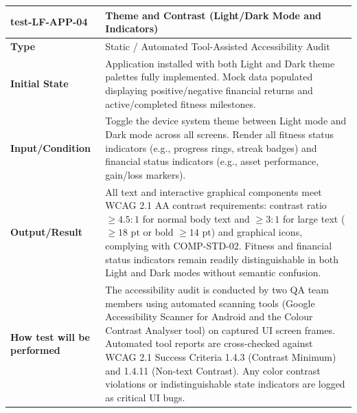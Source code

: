 \documentclass[12pt, titlepage]{article}
\begin{document}
\noindent\begin{tabularx}{\textwidth}{>{\raggedright\arraybackslash}p{3.5cm}X}
  \toprule
  \textbf{test-LF-APP-04}\label{test:LF-APP-04} & \textbf{Theme and Contrast (Light/Dark Mode and Indicators)}\\
  \midrule
  \textbf{Type} & Static / Automated Tool-Assisted Accessibility Audit\\
  \textbf{Initial State} & Application installed with both Light and Dark theme palettes fully implemented. Mock data populated displaying positive/negative financial returns and active/completed fitness milestones.\\
  \textbf{Input/Condition} & Toggle the device system theme between Light mode and Dark mode across all screens. Render all fitness status indicators (e.g., progress rings, streak badges) and financial status indicators (e.g., asset performance, gain/loss markers).\\
  \textbf{Output/Result} & All text and interactive graphical components meet WCAG 2.1 AA contrast requirements: contrast ratio $\ge 4.5:1$ for normal body text and $\ge 3:1$ for large text ($\ge 18\text{ pt}$ or bold $\ge 14\text{ pt}$) and graphical icons, complying with COMP-STD-02. Fitness and financial status indicators remain readily distinguishable in both Light and Dark modes without semantic confusion.\\
  \textbf{How test will be performed} & The accessibility audit is conducted by two QA team members using automated scanning tools (Google Accessibility Scanner for Android and the Colour Contrast Analyser tool) on captured UI screen frames. Automated tool reports are cross-checked against WCAG 2.1 Success Criteria 1.4.3 (Contrast Minimum) and 1.4.11 (Non-text Contrast). Any color contrast violations or indistinguishable state indicators are logged as critical UI bugs.\\
  \bottomrule
\end{tabularx}

\vspace{1em}
\end{document}
